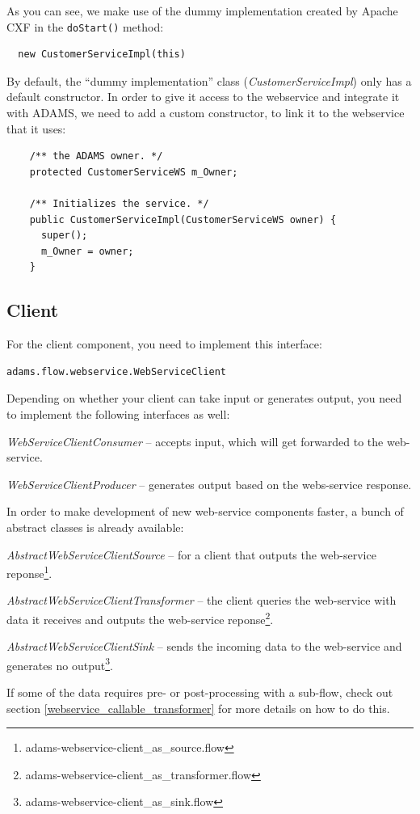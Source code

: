 \documentclass[a4paper]{book}
\begin{document}
As you can see, we make use of the dummy implementation created by Apache CXF
in the \texttt{doStart()} method:
\begin{verbatim}
  new CustomerServiceImpl(this)
\end{verbatim}

By default, the ``dummy implementation'' class (\textit{CustomerServiceImpl})
only has a default constructor. In order to give it access to the webservice
and integrate it with ADAMS, we need to add a custom constructor, to link it to the
webservice that it uses:
\begin{verbatim}
    /** the ADAMS owner. */
    protected CustomerServiceWS m_Owner;

    /** Initializes the service. */
    public CustomerServiceImpl(CustomerServiceWS owner) {
      super();
      m_Owner = owner;
    }
\end{verbatim}

\subsection{Client}
For the client component, you need to implement this interface:
\begin{verbatim}
adams.flow.webservice.WebServiceClient
\end{verbatim}
Depending on whether your client can take input or generates output, you need
to implement the following interfaces as well:
\begin{tight_itemize}
	\item \textit{WebServiceClientConsumer} -- accepts input, which will get
	forwarded to the web-service.
	\item \textit{WebServiceClientProducer} -- generates output based on the
	webs-service response.
\end{tight_itemize}
In order to make development of new web-service components faster, a bunch
of abstract classes is already available:
\begin{tight_itemize}
	\item \textit{AbstractWebServiceClientSource} -- for a client that outputs
	the web-service reponse\footnote{adams-webservice-client\_as\_source.flow}.
	\item \textit{AbstractWebServiceClientTransformer} -- the client queries the 
	web-service with data it receives and outputs the web-service 
	reponse\footnote{adams-webservice-client\_as\_transformer.flow}.
	\item \textit{AbstractWebServiceClientSink} -- sends the incoming data
	to the web-service and generates no output\footnote{adams-webservice-client\_as\_sink.flow}.
\end{tight_itemize}
If some of the data requires pre- or post-processing with a sub-flow, check
out section \ref{webservice_callable_transformer} for more details on how to do
this.
\end{document}
